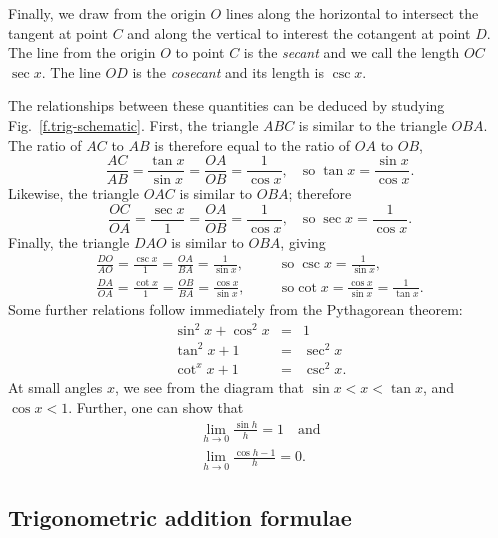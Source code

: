 Finally, we draw from the origin $O$ lines along the horizontal to intersect the tangent at point $C$ and along the vertical to interest the cotangent at point $D$.  
The line from the origin $O$ to point $C$ is the \emph{secant} and we call the length $OC$ $\sec x$. The line $OD$ is the \emph{cosecant} and its length is $\csc x$.

The relationships between these quantities can be deduced by studying Fig.~\ref{f.trig-schematic}.  First, the triangle $ABC$ is similar to the triangle $OBA$. The ratio of $AC$ to $AB$ is therefore equal to the ratio of $OA$ to $OB$,
\begin{equation}\label{e.tan}
	\frac{AC}{AB} = \frac{\tan x}{\sin x} = \frac{OA}{OB} = \frac{1}{\cos x},\quad\textrm{so}
	\;\tan x = \frac{\sin x}{\cos x}.
\end{equation}
Likewise, the triangle $OAC$ is similar to $OBA$; therefore
\begin{equation}\label{e.sec}
	\frac{OC}{OA} = \frac{\sec x}{1} = \frac{OA}{OB} = \frac{1}{\cos x},\quad\textrm{so}
	\;\sec x = \frac{1}{\cos x}.
\end{equation}
Finally, the triangle $DAO$ is similar to $OBA$, giving
\begin{eqnarray}
	\frac{DO} {AO} = \frac{\csc x}{1} = \frac{OA}{BA} = \frac{1}{\sin x},&\quad&\textrm{so}
	\;\csc x = \frac{1}{\sin x},\label{e.csc}\\
	\frac{DA}{OA} = \frac{\cot x}{1} =  \frac{OB}{BA} = \frac{\cos x}{\sin x},&\quad&\textrm{so}
	\cot x = \frac{\cos x}{\sin x} = \frac{1}{\tan x}.\label{e.cot}
\end{eqnarray}
Some further relations follow immediately from the Pythagorean theorem:
\begin{eqnarray*}
	\sin^{2} x + \cos^{2} x &=& 1 \\
	\tan^{2} x + 1 &=& \sec^{2} x \\
	\cot^{x} x + 1 &=& \csc^{2} x.
\end{eqnarray*}
At small angles $x$, we see from the diagram that
$ \sin x < x < \tan x$, and $\cos x < 1$.
Further, one can show\cite{Courant1996What-is-Mathema} that
\begin{eqnarray}
	\lim_{h\to 0}\frac{\sin h}{h} = 1\quad\textrm{and}\label{e.lim-sine}\\
	\lim_{h\to 0}\frac{\cos h -1}{h} = 0.\label{e.lim-cosine}
\end{eqnarray}

\subsection{Trigonometric addition formulae}

